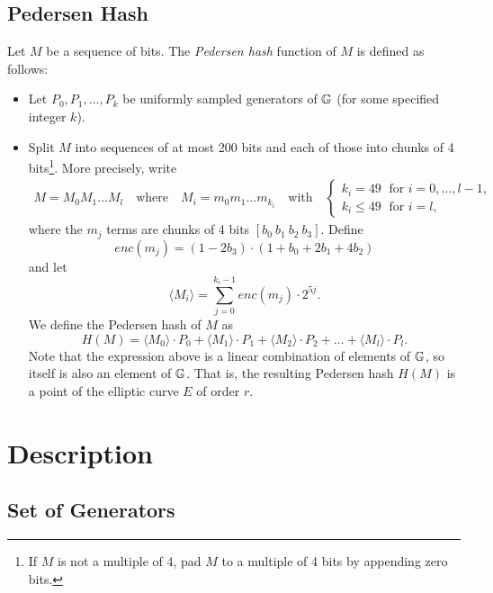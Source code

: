 \documentclass{article}
\begin{document}
\begin{spacing}{1.2}
	\subsection{Pedersen Hash}
	Let $M$ be a sequence of bits. The {\it Pedersen hash} function of $M$ is defined as follows:
	\begin{itemize}
		\item Let $P_0,P_1,\dots,P_k$ be uniformly sampled generators of $\mathbb{G}$ (for some specified integer $k$). 
		\item   Split $M$ into sequences of at most 200 bits and each of those into chunks of 4 bits{\footnote{If $M$ is not a multiple of 4, pad $M$ to a multiple of 4 bits by appending zero bits.}}. 
		More precisely, write  
			\begin{gather*}
				M = M_0M_1\dots M_l 
				\quad\text{where}\quad
				M_i = m_0m_1\dots m_{k_i}
				\quad\text{with}\quad 
				\begin{cases}
				k_i = 49 	\;\text{ for }  i = 0, \dots, l-1, \\
				k_i \leq 49 \;\text{ for }  i = l,
				\end{cases}
			\end{gather*}
		where the $m_j$ terms are chunks of 4 bits $[b_0\: b_1\: b_2\: b_3]$. 
		Define  
			$$ enc(m_j) = (1 - 2b_3) 
			\cdot (1+b_{0}+2b_{1}+4b_{2}) $$
		and let 
			$$ \langle M_i \rangle = \sum_{j=0}^{k_i-1} enc(m_j) \cdot 2^{5j}.	$$
		We define the Pedersen hash of $M$ as
			\begin{equation}
				\label{eq-ped}
				H(M) = \langle M_0 \rangle \cdot P_0 
				+  \langle M_1 \rangle \cdot P_1 
				+  \langle M_2 \rangle \cdot P_2 
				+ \dots + \langle M_l \rangle \cdot P_l.	
			\end{equation}
		Note that the expression above is a linear combination of elements of $\mathbb{G}$, so itself is also an element of $\mathbb{G}$. That is, the resulting Pedersen hash $H(M)$ is a point of the elliptic curve $E$ of order $r$.
	\end{itemize}

\section{Description}

	\subsection{Set of Generators}
	

\end{spacing}
\end{document}
